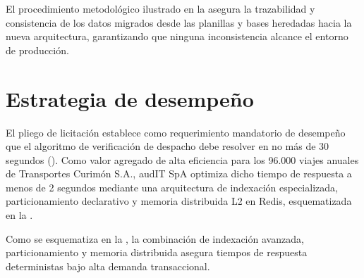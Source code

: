 
El procedimiento metodológico ilustrado en la  asegura la trazabilidad y consistencia de los datos migrados desde las planillas y bases heredadas hacia la nueva arquitectura, garantizando que ninguna inconsistencia alcance el entorno de producción.
\section{Estrategia de desempeño}\label{sec:5-desempeno}

El pliego de licitación establece como requerimiento mandatorio de desempeño que el algoritmo de verificación de despacho debe resolver en no más de 30 segundos (). Como valor agregado de alta eficiencia para los 96.000 viajes anuales de Transportes Curimón S.A., audIT SpA optimiza dicho tiempo de respuesta a menos de 2 segundos mediante una arquitectura de indexación especializada, particionamiento declarativo y memoria distribuida L2 en Redis, esquematizada en la .


Como se esquematiza en la , la combinación de indexación avanzada, particionamiento y memoria distribuida asegura tiempos de respuesta deterministas bajo alta demanda transaccional.

